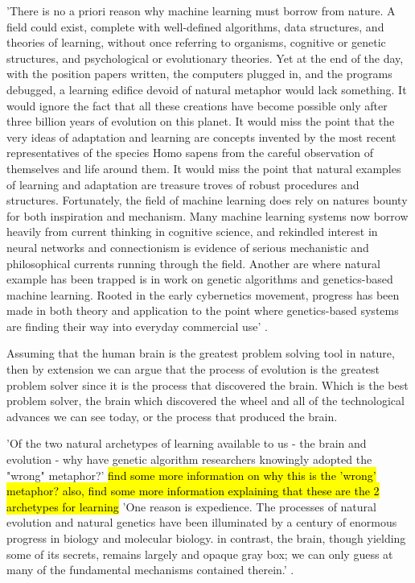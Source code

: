'There is no a priori reason why machine learning must borrow from nature. A field could exist, complete with well-defined algorithms, data structures, and theories of learning, without once referring to organisms, cognitive or genetic structures, and psychological or evolutionary theories. Yet at the end of the day, with the position papers written, the computers plugged in, and the programs debugged, a learning edifice devoid of natural metaphor would lack something. It would ignore the fact that all these creations have become possible only after three billion years of evolution on this planet. It would miss the point that the very ideas of adaptation and learning are concepts invented by the most recent representatives of the species Homo sapens from the careful observation of themselves and life around them. It would miss the point that natural examples of learning and adaptation are treasure troves of robust procedures and structures. Fortunately, the field of machine learning does rely on natures bounty for both inspiration and mechanism. Many machine learning systems now borrow heavily from current thinking in cognitive science, and rekindled interest in neural networks and connectionism is evidence of serious mechanistic and philosophical currents running through the field. Another are where natural example has been trapped is in work on genetic algorithms and genetics-based machine learning. Rooted in the early cybernetics movement, progress has been made in both theory and application to the point where genetics-based systems are finding their way into everyday commercial use' \cite{goldberg1988genetic}.

Assuming that the human brain is the greatest problem solving tool in nature, then by extension we can argue that the process of evolution is the greatest problem solver since it is the process that discovered the brain.
Which is the best problem solver, the brain which discovered the wheel and all of the technological advances we can see today, or the process that produced the brain.

'Of the two natural archetypes of learning available to us - the brain and evolution - why have genetic algorithm researchers knowingly adopted the "wrong" metaphor?' \cite{goldberg1988genetic} \hl{find some more information on why this is the 'wrong' metaphor? also, find some more information explaining that these are the 2 archetypes for learning}
'One reason is expedience. The processes of natural evolution and natural genetics have been illuminated by a century of enormous progress in biology and molecular biology. in contrast, the brain, though yielding some of its secrets, remains largely and opaque gray box; we can only guess at many of the fundamental mechanisms contained therein.' \cite{goldberg1988genetic}.




